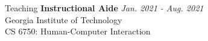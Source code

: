 \documentclass{cv} %
\begin{document}
\begin{rSection}{Teaching}
{\bf Instructional Aide} \hfill {\em Jan. 2021 - Aug. 2021}\\
Georgia Institute of Technology\\
CS 6750: Human-Computer Interaction\\
\end{rSection}
\end{document}
